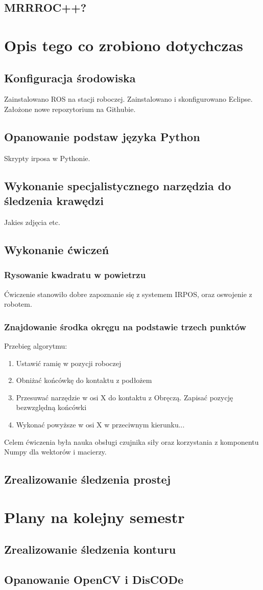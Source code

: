 \documentclass[12pt, a4paper, twoside]{book}
\begin{document}
	\section{MRRROC++?}
\chapter{Opis tego co zrobiono dotychczas}
	\section{Konfiguracja środowiska}
Zainstalowano ROS na stacji roboczej. Zainstalowano i skonfigurowano Eclipse. Założone nowe repozytorium na Githubie.		
	\section{Opanowanie podstaw języka Python}
Skrypty irposa w Pythonie.
	\section{Wykonanie specjalistycznego narzędzia do śledzenia krawędzi}
Jakies zdjęcia etc.
	\section{Wykonanie ćwiczeń}
		\subsection{Rysowanie kwadratu w powietrzu}
		Ćwiczenie stanowiło dobre zapoznanie się z systemem IRPOS, oraz oswojenie z robotem.
		\subsection{Znajdowanie środka okręgu na podstawie trzech punktów}
		Przebieg algorytmu:
			\begin{enumerate}
			\item Ustawić ramię w pozycji roboczej
			\item Obniżać końcówkę do kontaktu z podłożem
			\item Przesuwać narzędzie w osi X do kontaktu z Obręczą. Zapisać pozycję bezwzględną końcówki
			\item Wykonać powyższe w osi X w przeciwnym kierunku...
			\end{enumerate}
		Celem ćwiczenia była nauka obsługi czujnika siły oraz korzystania z komponentu Numpy dla wektorów i macierzy.
	\section{Zrealizowanie śledzenia prostej}
		
\chapter{Plany na kolejny semestr}
	\section{Zrealizowanie śledzenia konturu}
	\section{Opanowanie OpenCV i DisCODe}
\end{document}

